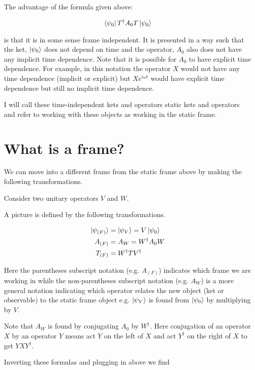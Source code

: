 \documentclass[12pt]{article}
\begin{document}
The advantage of the formula given above:

\begin{align}
\bra{\psi_0}T^{\dag}A_0T\ket{\psi_0}
\end{align}

is that it is in some sense frame independent. It is presented in a way such that the ket, $\ket{\psi_0}$ does not depend on time and the operator, $A_0$ also does not have any implicit time dependence. Note that it is possible for $A_0$ to have explicit time dependence. For example, in this notation the operator $X$ would not have any time dependence (implicit or explicit) but $X e^{i\omega t}$ would have explicit time dependence but still no implicit time dependence.

I will call these time-independent kets and operators static kets and operators and refer to working with these objects as working in the static frame.

\section{What is a frame?}

We can move into a different frame from the static frame  above by making the following transformations.




Consider two unitary operators $V$ and $W$.

A picture is defined by the following transformations.

\begin{align}
\ket{\psi_{(F)}} &= \ket{\psi_V} = V \ket{\psi_0}\\
A_{(F)} &= A_W = W^{\dag}A_0 W\\
T_{(F)} &= W^{\dag} T V^{\dag}
\end{align}

Here the parentheses subscript notation (e.g. $A_{(F)}$) indicates which frame we are working in while the non-parentheses subscript notation (e.g. $A_W$) is a more general notation indicating which operator relates the new object (ket or observable) to the static frame object e.g. $\ket{\psi_V}$ is found from $\ket{\psi_0}$ by multiplying by $V$.

Note that $A_W$ is found by conjugating $A_0$ by $W^{\dag}$. Here conjugation of an operator $X$ by an operator $Y$ means act $Y$ on the left of $X$ and act $Y^{\dag}$ on the right of $X$ to get $YXY^{\dag}$.

Inverting these formulas and plugging in above we find
\end{document}
